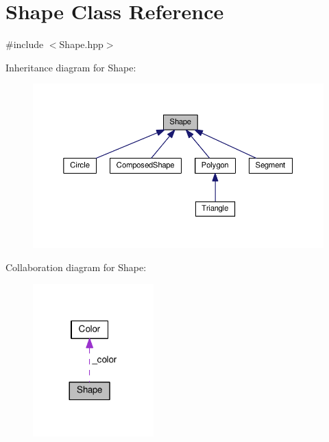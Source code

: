 \hypertarget{class_shape}{}\section{Shape Class Reference}
\label{class_shape}


{\ttfamily \#include $<$Shape.\+hpp$>$}



Inheritance diagram for Shape\+:\nopagebreak
\begin{figure}[H]
\begin{center}
\leavevmode
\includegraphics[width=350pt]{class_shape__inherit__graph}
\end{center}
\end{figure}


Collaboration diagram for Shape\+:\nopagebreak
\begin{figure}[H]
\begin{center}
\leavevmode
\includegraphics[width=132pt]{class_shape__coll__graph}
\end{center}
\end{figure}
